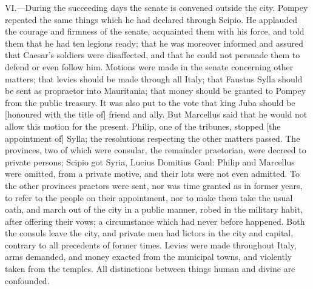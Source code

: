 VI.—During the succeeding days the senate is convened outside the city.
Pompey repeated the same things which he had declared through Scipio. He
applauded the courage and firmness of the senate, acquainted them with
his force, and told them that he had ten legions ready; that he was
moreover informed and assured that Caesar's soldiers were disaffected,
and that he could not persuade them to defend or even follow him.
Motions were made in the senate concerning other matters; that levies
should be made through all Italy; that Faustus Sylla should be sent as
propraetor into Mauritania; that money should be granted to Pompey from
the public treasury. It was also put to the vote that king Juba should
be [honoured with the title of] friend and ally. But Marcellus said that
he would not allow this motion for the present. Philip, one of the
tribunes, stopped [the appointment of] Sylla; the resolutions respecting
the other matters passed. The provinces, two of which were consular, the
remainder praetorian, were decreed to private persons; Scipio got Syria,
Lucius Domitius Gaul: Philip and Marcellus were omitted, from a private
motive, and their lots were not even admitted. To the other provinces
praetors were sent, nor was time granted as in former years, to refer to
the people on their appointment, nor to make them take the usual oath,
and march out of the city in a public manner, robed in the military
habit, after offering their vows; a circumstance which had never before
happened. Both the consuls leave the city, and private men had lictors
in the city and capital, contrary to all precedents of former times.
Levies were made throughout Italy, arms demanded, and money exacted from
the municipal towns, and violently taken from the temples. All
distinctions between things human and divine are confounded.


